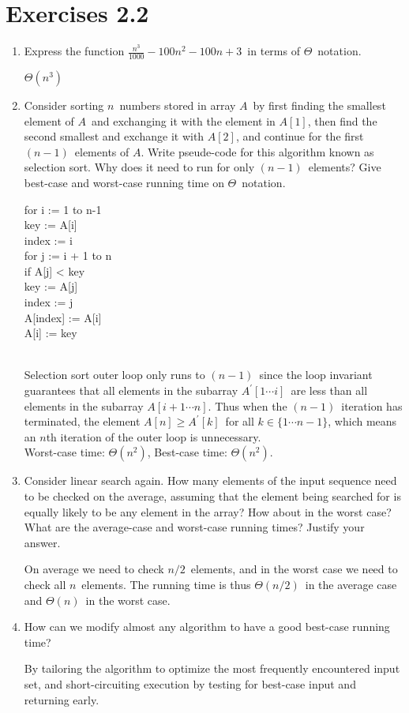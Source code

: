 \documentclass{article}
\newcommand{\?}{\stackrel{?}{=}}
\newcommand\Ans[2][]{%
   \leavevmode\noindent
   {
       \begin{mdframed}[backgroundcolor=blue!10]
       #2
       \end{mdframed}
   }
}
\begin{document}
\section{Exercises 2.2}
\begin{enumerate}
	\item Express the function $\frac{n^3}{1000} - 100n^2 - 100n + 3$\ in terms of $\Theta$\ notation.
	\Ans{$\Theta(n^3)$}
	\item Consider sorting $n$\ numbers stored in array $A$\ by first finding the smallest element of $A$\ and exchanging it with the element in $A[1]$, then find the second smallest and exchange it with $A[2]$, and continue for the first $(n-1)$\ elements of $A$.  Write pseude-code for this algorithm known as selection sort.  Why does it need to run for only $(n-1)$\ elements?  Give best-case and worst-case running time on $\Theta$\ notation.
	\Ans{
	  \setlength{\parindent}{5ex}
	  \begin{tt}
	  	for i := 1 to n-1 \\
	  	\indent key := A[i] \\
	  	\indent index := i \\
	  	\indent for j := i + 1 to n \\
	  	\indent \indent if A[j] < key \\
	  	\indent \indent \indent key := A[j] \\
	  	\indent \indent \indent index := j \\
	  	\indent A[index] := A[i] \\
	  	\indent A[i] := key
	  \end{tt} \\
	  Selection sort outer loop only runs to $(n-1)$\ since the loop invariant guarantees that all elements in the subarray $A^\prime[1\cdots i]$\ are less than all elements in the subarray $A[i+1\cdots n]$.  Thus when the $(n-1)$\ iteration has terminated, the element $A[n] \geq A^\prime[k]$\ for all $k \in \{1\cdots n-1\}$, which means an $n$th iteration of the outer loop is unnecessary. \\
	  Worst-case time: $\Theta(n^2)$, 
	  Best-case time: $\Theta(n^2)$.
	}
	\item Consider linear search again.  How many elements of the input sequence need to be checked on the average, assuming that the element being searched for is equally likely to be any element in the array?  How about in the worst case?  What are the average-case and worst-case running times?  Justify your answer.
	\Ans{On average we need to check $n/2$\ elements, and in the worst case we need to check all $n$\ elements.  The running time is thus $\Theta(n/2)$\ in the average case and $\Theta(n)$\ in the worst case.}
	\item How can we modify almost any algorithm to have a good best-case running time?
	\Ans{By tailoring the algorithm to optimize the most frequently encountered input set, and short-circuiting execution by testing for best-case input and returning early.}
\end{enumerate}
\end{document}
